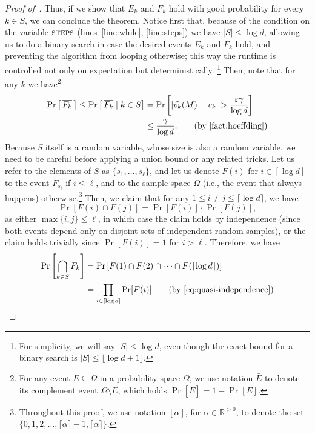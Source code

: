 \begin{proof}[Proof of~]
Thus, if we show that $E_k$ and $F_k$ hold with good probability for every $k \in S$, we can conclude the theorem.
Notice first that, because of the condition on the variable $\textsc{steps}$ (lines~\ref{line:while}, \ref{line:steps}) we have $|S| \leq \log d$, allowing us to do a binary search in case the desired events $E_k$ and $F_k$ hold, and preventing the algorithm from looping otherwise; this way the runtime is controlled not only on expectation but deterministically. \footnote{For simplicity, we will say $|S| \leq \log d$, even though the exact bound for a binary search is $|S| \leq \lfloor \log d  + 1 \rfloor$.} Then, note that for any $k$ we have\footnote{For any event $E \subseteq \Omega$ in a probability space $\Omega$, we use notation $\bar{E}$ to denote its complement event $\Omega \setminus E$, which holds $\Pr[\bar{E}] = 1 - \Pr[E]$.}
\begin{align*}
	\Pr\left[ \, \overline{F_k} \,\right] \leq \Pr\left[ \, \overline{F_k} \mid k \in S \right] &= \Pr\left[|\widehat{v_k}(M) - v_k| > \frac{\varepsilon \gamma}{\log d}\right]\\
	&\leq \frac{\gamma}{\log d}. \tag{by~\Cref{fact:hoeffding}}
\end{align*}
Because $S$ itself is a random variable, whose size is also a random variable, we need to be careful before applying a union bound or any related tricks. Let us refer to the elements of $S$ as $\{s_1, \ldots, s_\ell\}$, and let us denote $F(i)$ for $i \in [\log d]$ to the event $F_{s_i}$ if $i \leq \ell$, and to the sample space $\Omega$ (i.e., the event that always happens) otherwise.\footnote{Throughout this proof, we use notation $[\alpha]$, for $\alpha \in \mathbb{R}^{> 0}$, to denote the set $\{0, 1, 2, \ldots, \lceil \alpha \rceil - 1, \lceil \alpha \rceil\}$.}  
Then, we claim that for any $1 \leq i \neq j \leq \lceil\log d\rceil$, we have 
\begin{equation}\label{eq:quasi-independence}
	\Pr[F(i) \cap F(j)] = \Pr[F(i)] \cdot \Pr[F(j)],
\end{equation}
as either $\max \{i, j\} \leq \ell$, in which case the claim holds by independence (since both events depend only on disjoint sets of independent random samples), or the claim holds trivially since $\Pr[F(i)] = 1$ for $i > \ell$.
Therefore, we have 
\begin{align*}
\Pr\left[\bigcap_{k \in S} F_k\right] &= \Pr\left[F(1) \cap F(2) \cap \cdots \cap F(\lceil\log d\rceil)\right]\\
&= \prod_{i \in [\log d]} \Pr[F(i)]\tag{by~\Cref{eq:quasi-independence}}\\

\end{align*}
\end{proof}
